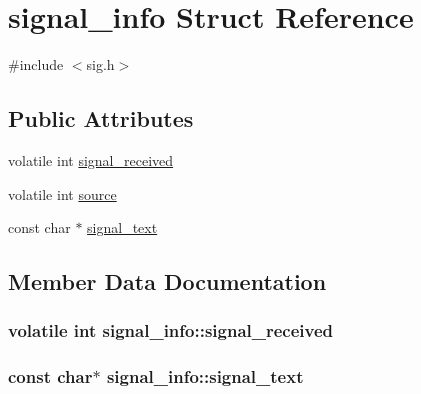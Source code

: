 \hypertarget{structsignal__info}{}\section{signal\+\_\+info Struct Reference}
\label{structsignal__info}


{\ttfamily \#include $<$sig.\+h$>$}

\subsection*{Public Attributes}
\begin{DoxyCompactItemize}
\item 
volatile int \hyperlink{structsignal__info_a10c4ea0e5a7070d7d802d2e9c7eecb67}{signal\+\_\+received}
\item 
volatile int \hyperlink{structsignal__info_aff345ec3f6a0b37155a2561e9ff7f0b5}{source}
\item 
const char $\ast$ \hyperlink{structsignal__info_a0062d540b64b1957a2fdd7155ef9edf9}{signal\+\_\+text}
\end{DoxyCompactItemize}


\subsection{Member Data Documentation}
\hypertarget{structsignal__info_a10c4ea0e5a7070d7d802d2e9c7eecb67}{}
\subsubsection[{signal\+\_\+received}]{\setlength{\rightskip}{0pt plus 5cm}volatile int signal\+\_\+info\+::signal\+\_\+received}\label{structsignal__info_a10c4ea0e5a7070d7d802d2e9c7eecb67}
\hypertarget{structsignal__info_a0062d540b64b1957a2fdd7155ef9edf9}{}
\subsubsection[{signal\+\_\+text}]{\setlength{\rightskip}{0pt plus 5cm}const char$\ast$ signal\+\_\+info\+::signal\+\_\+text}\label{structsignal__info_a0062d540b64b1957a2fdd7155ef9edf9}
\hypertarget{structsignal__info_aff345ec3f6a0b37155a2561e9ff7f0b5}{}
